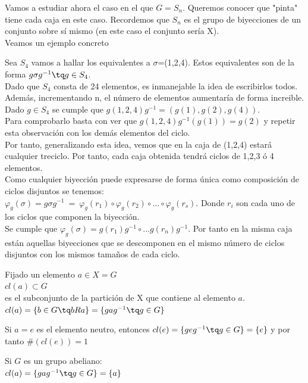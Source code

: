 \documentclass{apuntes}
\begin{document}
Vamos a estudiar ahora el caso en el que $G=S_{n}$. Queremos conocer que "pinta" tiene cada caja en este caso. Recordemos que 
$S_{n}$  es el grupo de biyecciones de un conjunto sobre sí mismo (en este caso el conjunto sería X).\\
Veamos un ejemplo concreto
\begin{example}
 Sea $S_{4}$  vamos a hallar los equivalentes a $\sigma$=(1,2,4). Estos equivalentes son de la forma $g\sigma g^{-1} \tq g \in S_{4}$.\\
 Dado que $S_{4}$  consta de 24 elementos, es inmanejable la idea de escribirlos todos. Además, incrementando n, el número de elementos
 aumentaría de forma increible.\\
 Dado $g\in S_{4}$  se cumple que $g(1,2,4)g^{-1}=(g(1),g(2),g(4))$.\\
 Para comprobarlo basta con ver que $g(1,2,4)g^{-1}(g(1))=g(2)$  y repetir esta observación con los demás elementos del ciclo.\\
 Por tanto, generalizando esta idea, vemos que en la caja de (1,2,4) estará cualquier treciclo. Por tanto, cada caja obtenida tendrá
 ciclos de 1,2,3 ó 4 elementos.\\
 Como cualquier biyección puede expresarse de forma única como composición de ciclos disjuntos se tenemos:\\
 $\varphi_{g}(\sigma)=g\sigma g^{-1}\ = \ \varphi_{g}(r_{1}) \circ \varphi_{g}(r_{2}) \circ ... \circ \varphi_{g}(r_{s})$. Donde $r_{i}$  son cada uno de los
 ciclos que componen la biyección.\\
 Se cumple que $\varphi_{g}(\sigma)=g(r_{1})g^{-1} \circ ... g(r_{n})g^{-1}$.  Por tanto en la misma caja están aquellas biyecciones que se descomponen
 en el mismo número de ciclos disjuntos con los mismos tamaños de cada ciclo.
\end{example}

\begin{defn}
Fijado un elemento $a\in X = G$\\
$cl(a) \subset G$\\ es el subconjunto de la partición de X que contiene al elemento $a$.\\
$cl(a) = \{ b \in G \tq bRa \} = \{ gag^{-1} \tq g \in G \}$
\end{defn}

\obs Si $a = e$ es el elemento neutro, entonces $cl(e) = \{ geg^{-1} \tq g\in G\} = \{ e\} $ y por tanto $\# (cl(e)) = 1$

\obs Si $G$ es un grupo abeliano: \\ $cl(a) = \{ gag^{-1} \tq g \in G\} = \{ a \} $
\end{document}
